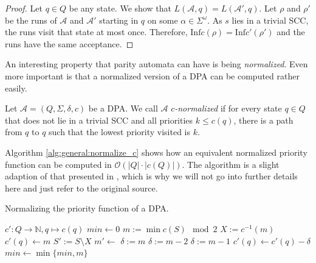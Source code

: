 \begin{proof}
	Let $q \in Q$ be any state. We show that $L(\mathcal{A}, q) = L(\mathcal{A}', q)$. Let $\rho$ and $\rho'$ be the runs of $\mathcal{A}$ and $\mathcal{A}'$ starting in $q$ on some $\alpha \in \Sigma^\omega$. As $s$ lies in a trivial SCC, the runs visit that state at most once. Therefore, $\text{Inf} c(\rho) = \text{Inf} c'(\rho')$ and the runs have the same acceptance.
\end{proof}

\vspace{10pt}

An interesting property that parity automata can have is being \emph{normalized}. Even more important is that a normalized version of a DPA can be computed rather easily.

\begin{defn}
	Let $\mathcal{A} = (Q, \Sigma, \delta, c)$ be a DPA. We call $\mathcal{A}$ \emph{$c$-normalized} if for every state $q \in Q$ that does not lie in a trivial SCC and all priorities $k \leq c(q)$, there is a path from $q$ to $q$ such that the lowest priority visited is $k$.
\end{defn}


Algorithm \ref{alg:general:normalize_c} shows how an equivalent normalized priority function can be computed in $\mathcal{O}(|Q| \cdot |c(Q)|)$. The algorithm is a slight adaption of that presented in \cite{CartonMaceiras99}, which is why we will not go into further details here and just refer to the original source.

\begin{algorithm}[h!]
  \caption{Normalizing the priority function of a DPA.}
  \label{alg:general:normalize_c}
  \begin{algorithmic}[1]
      \State $c' : Q \rightarrow \mathbb{N}, q \mapsto c(q)$
      \State {}
      \State {}
    \EndFunction
    \Statex
        \State {}
      \EndIf
      \State $min \gets 0$
        \State $m := \min c(S) \mod 2$
        \State $X := c^{-1}(m)$
          \State $c'(q) \gets m$
        \EndFor
        \State $S' := S \setminus X$
        \State $m' \gets $
            \State $\delta := m$
          \Else
            \State $\delta := m-2$
          \EndIf
        \Else
          \State $\delta := m-1$
        \EndIf
          \State $c'(q) \gets c'(q) - \delta$
        \EndFor
        \State $min \gets \min \{min, m\}$
      \EndFor
      \State {}
    \EndFunction
  \end{algorithmic}
\end{algorithm}








